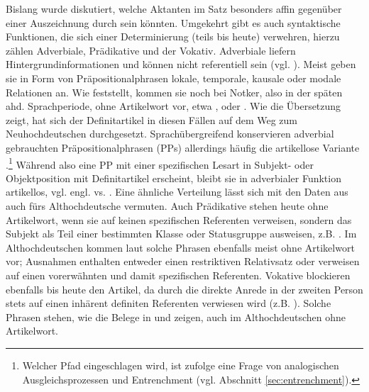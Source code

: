 Bislang wurde diskutiert, welche Aktanten im Satz besonders affin gegenüber einer Auszeichnung durch  sein könnten. Umgekehrt gibt es auch syntaktische Funktionen, die sich einer Determinierung (teils bis heute) verwehren, hierzu zählen Adverbiale, Prädikative und der Vokativ. Adverbiale liefern Hintergrundinformationen und können nicht referentiell sein (vgl. ). Meist geben sie in Form von Präpositionalphrasen lokale, temporale, kausale oder modale Relationen an. Wie \textcite[84]{Oubouzar1992} feststellt, kommen sie noch bei Notker, also in der späten ahd. Sprachperiode, ohne Artikelwort vor, etwa  ,   oder   \parencite[vgl. auch][76]{Szczepaniak2011a}. Wie die Übersetzung zeigt, hat sich der Definitartikel in diesen Fällen auf dem Weg zum Neuhochdeutschen durchgesetzt. Sprachübergreifend konservieren adverbial gebrauchten Präpositionalphrasen (PPs) allerdings häufig die artikellose Variante \parencite{Himmelmann1998}.\footnote{Welcher Pfad eingeschlagen wird, ist \textcite[342 und 344f.]{Himmelmann1998} zufolge eine Frage von analogischen Ausgleichsprozessen und Entrenchment (vgl. Abschnitt \ref{sec:entrenchment}).} Während also eine PP mit einer spezifischen Lesart in Subjekt- oder Objektposition mit Definitartikel erscheint, bleibt sie in adverbialer Funktion artikellos, vgl. engl.  vs.  \parencite[332]{Himmelmann1998}. Eine ähnliche Verteilung lässt sich mit den Daten aus \textcite[84f.]{Oubouzar1992} auch fürs Althochdeutsche vermuten. Auch Prädikative stehen heute ohne Artikelwort, wenn sie auf keinen spezifischen Referenten verweisen, sondern das Subjekt als Teil einer bestimmten Klasse oder Statusgruppe ausweisen, z.B.  \parencite[vgl.][218]{DAvis2013}. Im Althochdeutschen kommen laut \textcite[6--8]{Graf1905} solche Phrasen ebenfalls meist ohne Artikelwort vor; Ausnahmen enthalten entweder einen restriktiven Relativsatz oder verweisen auf einen  vorerwähnten und damit spezifischen Referenten. Vokative blockieren ebenfalls bis heute den Artikel, da durch die direkte Anrede in der zweiten Person stets auf einen inhärent definiten Referenten verwiesen wird (z.B. ). Solche Phrasen stehen, wie die Belege in \textcite[13]{Graf1905} und \textcite[40]{Bell1907} zeigen, auch im Althochdeutschen ohne Artikelwort. 

